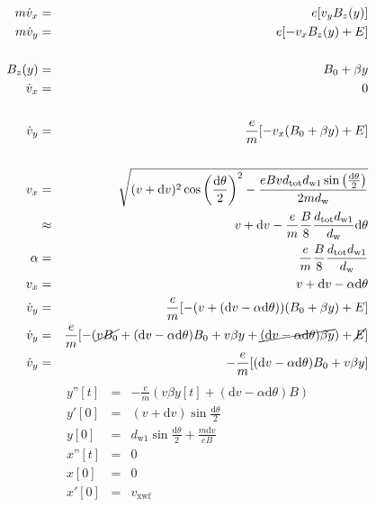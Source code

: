 \documentclass[12pt,letterpaper]{article}
\newcommand{\dd}[1]{\mathrm{d} #1}
\begin{document}
\begin{eqnarray*}
   m\dot{v}_x &=& e[v_y B_z(y)] \\
   m\dot{v}_y &=& e[- v_x B_z(y)+E] \\ \\
   B_z(y)&=& B_0+\beta y \\ 
   \dot{v}_x &=& 0 \\ \\
   \dot{v}_y &=& \frac{e}{m}[-v_x (B_0+\beta y)+E] \\ \\
   v_x &=& \sqrt{(v+\dd{v})^2\cos\left(\frac{\dd{\theta}}{2}\right)^2-\frac{eBvd_\text{tot}d_\text{w1}\sin\left(\frac{\dd{\theta}}{2}\right)}{2md_\text{w}}} \\
   & \approx & v+\dd{v}-\frac{e}{m}\frac{B}{8}\frac{d_\text{tot} d_\text{w1} }{ d_\text{w}} \dd{\theta}\\
   \alpha &=& \frac{e}{m}\frac{B}{8}\frac{d_\text{tot} d_\text{w1} }{ d_\text{w}} \\ 
   v_x&=& v+\dd{v}-\alpha \dd{\theta}\\
   \dot{v}_y &=& \frac{e}{m}[-(v+(\dd{v}-\alpha \dd{\theta})) (B_0+\beta y)+E] \\
   \dot{v}_y &=& \frac{e}{m}[-(\cancel{vB_0}+(\dd{v}-\alpha \dd{\theta})B_0+v\beta y+\cancel{(\dd{v}-\alpha \dd{\theta})\beta y})+\cancel{E}] \\
   \dot{v}_y &=& - \frac{e}{m}[(\dd{v}-\alpha \dd{\theta})B_0+v\beta y]
\end{eqnarray*}
\begin{eqnarray*}
   y\text{''}[t]&=& -\frac{e}{m}\left(v\beta y[t]+(\mathrm{d}v-\alpha \mathrm{d}\theta)B\right)\\ 
   y'[0]&=& (v+\dd{v}) \sin{\frac{\dd{\theta}}{2}} \\
   y[0] &=& d_\text{w1} \sin{\frac{\dd{\theta}}{2}}+\frac{m \dd{v}}{e B} \\
   x\text{''}[t]&=& 0\\
   x[0]&=& 0 \\
   x'[0]&=&  v_\text{xwf} 
\end{eqnarray*}
\end{document}
